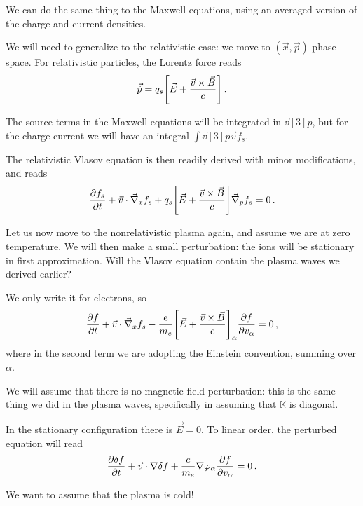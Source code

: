 \documentclass[main.tex]{subfiles}
\begin{document}
We can do the same thing to the Maxwell equations, using an averaged version of the charge and current densities.

We will need to generalize to the relativistic case: we move to \((\vec{x}, \vec{p})\) phase space. 
For relativistic particles, the Lorentz force reads 
%
\begin{align}
\vec{\dot{p}} = q_s \qty[\vec{E} + \frac{\vec{v} \times \vec{B}}{c}]
\,.
\end{align}

The source terms in the Maxwell equations will be integrated in \(\dd[3]{p}\), but for the charge current we will have an integral \(\int \dd[3]{p} \vec{v} f_s\). 

The relativistic Vlasov equation is then readily derived with minor modifications, and reads 
%
\begin{align}
\pdv{f_s}{t} + \vec{v} \cdot \vec{\nabla}_x f_s + q_s \qty[ \vec{E} + \frac{\vec{v} \times \vec{B}}{c}] \vec{\nabla}_p f_s = 0 
\,.
\end{align}

Let us now move to the nonrelativistic plasma again, and assume we are at zero temperature. 
We will then make a small perturbation: the ions will be stationary in first approximation. 
Will the Vlasov equation contain the plasma waves we derived earlier? 

We only write it for electrons, so 
%
\begin{align}
\pdv{f}{t} + \vec{v} \cdot \vec{\nabla}_x f_s 
- \frac{e}{m_e} \qty[\vec{E} + \frac{\vec{v} \times \vec{B}}{c}]_\alpha \pdv{f}{v_\alpha } = 0
\,,
\end{align}
%
where in the second term we are adopting the Einstein convention, summing over \(\alpha \). 

We will assume that there is no magnetic field perturbation: this is the same thing we did in the plasma waves, specifically in assuming that \(\mathbb{K}\) is diagonal.


In the stationary configuration there is \(\vec{E} = 0\). 
To linear order, the perturbed equation will read 
%
\begin{align}
\pdv{ \delta f}{t} + \vec{v} \cdot \nabla \delta f + \frac{e}{m_e} \nabla \varphi _\alpha \pdv{f}{v_\alpha } = 0
\,.
\end{align}

We want to assume that the plasma is cold! 
\end{document}
